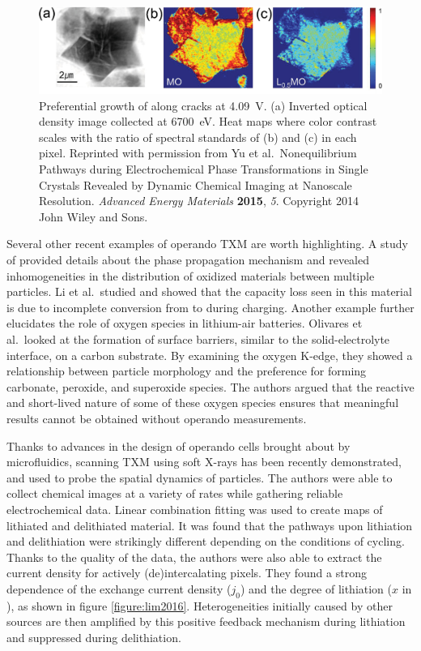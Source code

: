 \documentclass[journal=cmatex,manuscript=perspective]{achemso}
\begin{document}
\begin{figure}
  \includegraphics[width=\textwidth]{yu2015}
  \caption{Preferential growth of  along cracks at
    \SI{4.09}{V}. (a) Inverted optical density image collected at
    \SI{6700}{eV}. Heat maps where color contrast scales with the
    ratio of spectral standards of (b)  and (c)
     in each pixel. Reprinted with permission from
    Yu et al.\ Nonequilibrium Pathways during Electrochemical Phase
    Transformations in Single Crystals Revealed by Dynamic Chemical
    Imaging at Nanoscale Resolution. \textit{Advanced Energy
      Materials} \textbf{2015}, \textit{5}. Copyright 2014 John Wiley
    and Sons.}
  \label{figure:yu2015}
\end{figure}

Several other recent examples of operando TXM are worth
highlighting. A study of  provided details about the phase
propagation mechanism and revealed inhomogeneities in the distribution
of oxidized materials between multiple particles\cite{wang2014}. Li et
al.\ studied  and showed that the capacity loss seen in this
material is due to incomplete conversion from  to 
during charging\cite{jin2015}. Another example further elucidates the
role of oxygen species in lithium-air batteries. Olivares et
al.\ looked at the formation of surface barriers, similar to the
solid-electrolyte interface, on a carbon substrate. By examining the
oxygen K-edge, they showed a relationship between particle morphology
and the preference for forming carbonate, peroxide, and superoxide
species\cite{olivares2015}. The authors argued that the reactive and
short-lived nature of some of these oxygen species ensures that
meaningful results cannot be obtained without operando measurements.

Thanks to advances in the design of operando cells brought about by
microfluidics, scanning TXM using soft X-rays has been recently
demonstrated, and used to probe the spatial dynamics of 
particles\cite{lim2016}. The authors were able to collect chemical
images at a variety of rates while gathering reliable electrochemical
data. Linear combination fitting was used to create maps of lithiated
and delithiated material. It was found that the pathways upon
lithiation and delithiation were strikingly different depending on the
conditions of cycling. Thanks to the quality of the data, the authors
were also able to extract the current density for actively
(de)intercalating pixels. They found a strong dependence of the
exchange current density ($j_0$) and the degree of lithiation ($x$ in
), as shown in figure
\ref{figure:lim2016}. Heterogeneities initially caused by other
sources are then amplified by this positive feedback mechanism during
lithiation and suppressed during delithiation.
\end{document}
